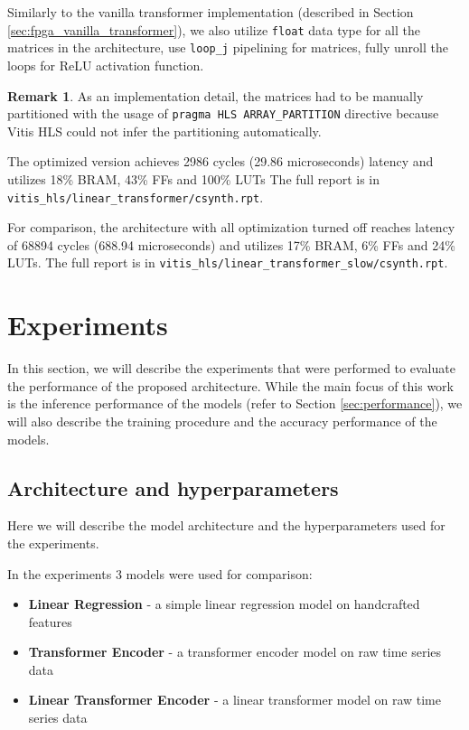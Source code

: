 \documentclass[a4paper, twoside]{report}
\theoremstyle{definition}
\newtheorem{remark}[theorem]{Remark}
\numberwithin{equation}{section}
\begin{document}
Similarly to the vanilla transformer implementation (described in Section \ref{sec:fpga_vanilla_transformer}),
we also utilize \texttt{float} data type for all the matrices in the architecture,
use \texttt{loop\_j} pipelining for matrices, fully unroll the loops for ReLU activation function.

\begin{remark}
    As an implementation detail, the matrices had to be manually partitioned
    with the usage of \texttt{pragma HLS ARRAY\_PARTITION} directive because
    Vitis HLS could not infer the partitioning automatically.
\end{remark}

The optimized version achieves 2986 cycles (29.86 microseconds) latency and utilizes 18\% BRAM, 43\% FFs and 100\% LUTs
\newline
The full report is in \texttt{vitis\_hls/linear\_transformer/csynth.rpt}.

For comparison, the architecture with all optimization turned off reaches latency of 68894 cycles (688.94 microseconds) and utilizes 17\% BRAM, 6\% FFs and 24\% LUTs.
The full report is in \texttt{vitis\_hls/linear\_transformer\_slow/csynth.rpt}.

\chapter{Experiments}

In this section, we will describe the experiments that were performed to evaluate the performance of the proposed architecture.
While the main focus of this work is the inference performance of the models (refer to Section \ref{sec:performance}),
we will also describe the training procedure and the accuracy performance of the models.

\section{Architecture and hyperparameters} \label{sec:architecture}

Here we will describe the model architecture and the hyperparameters used for the experiments.

In the experiments 3 models were used for comparison:
\begin{itemize}
    \item \textbf{Linear Regression} - a simple linear regression model on handcrafted features
    \item \textbf{Transformer Encoder} - a transformer encoder model on raw time series data
    \item \textbf{Linear Transformer Encoder} - a linear transformer model on raw time series data
\end{itemize}
\end{document}
